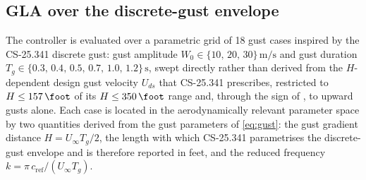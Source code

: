 \subsection{GLA over the discrete-gust envelope}
\label{subsec:mpc_results}

The controller is evaluated over a parametric grid of 18 gust cases inspired by the
CS-25.341 discrete gust: gust amplitude $W_0 \in \{10,\,20,\,30\}\,\si{\meter\per\second}$
and gust duration $T_g \in \{0.3,\,0.4,\,0.5,\,0.7,\,1.0,\,1.2\}\,\si{\second}$, swept directly
rather than derived from the $H$-dependent design gust velocity $U_{ds}$ that CS-25.341
prescribes, restricted to $H\le\SI{157}{\foot}$ of its $H\le\SI{350}{\foot}$ range and,
through the sign of , to upward gusts alone.
Each case is located in the aerodynamically relevant parameter space by two quantities derived
from the gust parameters of \cref{eq:gust}: the gust gradient distance $H = U_\infty T_g/2$, the
length with which CS-25.341 parametrises the discrete-gust envelope and is therefore reported in
feet, and the reduced frequency $k = \pi\,c_{\mathrm{ref}}/(U_\infty T_g)$.

